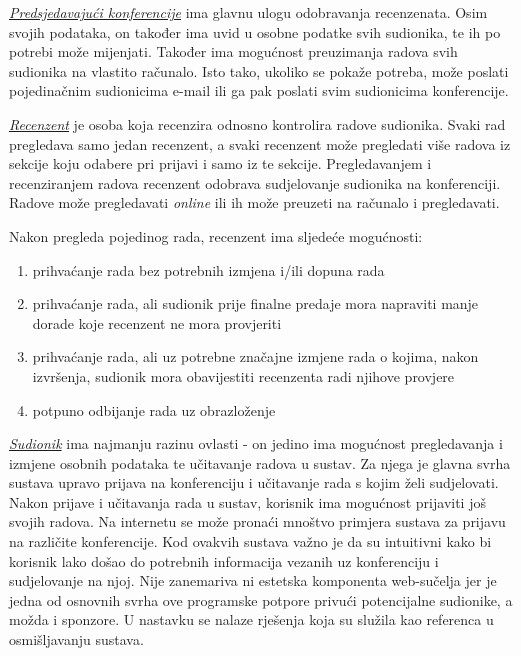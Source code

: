 		
		\underline{\textit{Predsjedavajući konferencije}} ima glavnu ulogu odobravanja recenzenata. Osim svojih podataka, on također ima uvid u osobne podatke svih sudionika, te ih po potrebi može mijenjati. Također ima mogućnost preuzimanja radova svih sudionika na vlastito računalo. Isto tako, ukoliko se pokaže potreba, može poslati pojedinačnim sudionicima e-mail ili ga pak poslati svim sudionicima konferencije. 
		
		
		\underline{\textit{Recenzent}} je osoba koja recenzira odnosno kontrolira radove sudionika. Svaki rad pregledava samo jedan recenzent, a svaki recenzent može pregledati više radova iz sekcije koju odabere pri prijavi i samo iz te sekcije. Pregledavanjem i recenziranjem radova recenzent odobrava sudjelovanje sudionika na konferenciji. Radove može pregledavati \textit{online} ili ih može preuzeti na računalo i pregledavati. 

		
		Nakon pregleda pojedinog rada, recenzent ima sljedeće mogućnosti:
		
		\begin{enumerate}
			
			\item prihvaćanje rada bez potrebnih izmjena i/ili dopuna rada
			\item prihvaćanje rada, ali sudionik prije finalne predaje mora napraviti manje dorade koje recenzent ne mora provjeriti
			\item prihvaćanje rada, ali uz potrebne značajne izmjene rada o kojima, nakon izvršenja, sudionik mora obavijestiti recenzenta radi njihove provjere
			\item potpuno odbijanje rada uz obrazloženje
			
		\end{enumerate}

		\indent \underline{\textit{Sudionik}} ima najmanju razinu ovlasti - on jedino ima mogućnost pregledavanja i izmjene osobnih podataka te učitavanje radova u sustav. Za njega je glavna svrha sustava upravo prijava na konferenciju i učitavanje rada s kojim želi sudjelovati. Nakon prijave i učitavanja rada u sustav, korisnik ima mogućnost prijaviti još svojih radova.
		\newline
		\newline
		\indent Na internetu se može pronaći mnoštvo primjera sustava za prijavu na različite konferencije. Kod ovakvih sustava važno je da su intuitivni kako bi korisnik lako došao do potrebnih informacija vezanih uz konferenciju i sudjelovanje na njoj. Nije zanemariva ni estetska komponenta web-sučelja jer je jedna od osnovnih svrha ove programske potpore privući potencijalne sudionike, a možda i sponzore. U nastavku se nalaze rješenja koja su služila kao referenca u osmišljavanju sustava.
		\newline
		\newline
		
